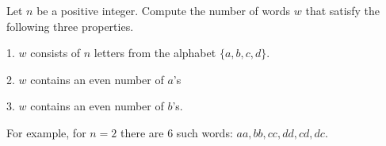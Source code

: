 Let $n$ be a positive integer. Compute the number of words $w$ that satisfy the following three properties.

1. $w$ consists of $n$ letters from the alphabet $\{a,b,c,d\}.$

2. $w$ contains an even number of $a$'s

3. $w$ contains an even number of $b$'s.

For example, for $n=2$ there are $6$ such words: $aa, bb, cc, dd, cd, dc.$